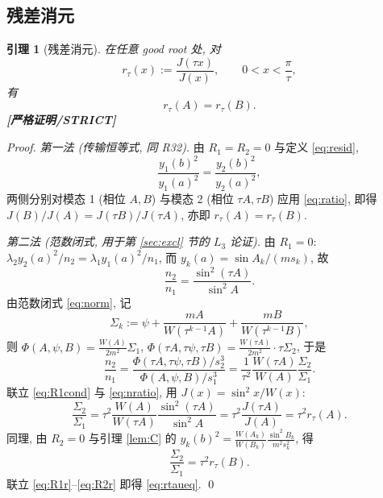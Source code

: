 \documentclass[UTF8]{ctexart}
\newtheorem{lemma}[theorem]{引理}
\newcommand{\STRICT}{\textbf{[严格证明/STRICT]}}
\begin{document}
\subsection{残差消元}

\begin{lemma}[残差消元]\label{lem:elim}
	在任意 good root 处, 对
	\begin{equation}
		r_\tau(x):=\frac{J(\tau x)}{J(x)},\qquad 0<x<\frac\pi\tau,
	\end{equation}
	有
	\begin{equation}
		r_\tau(A)=r_\tau(B).
		\label{eq:rtaueq}
	\end{equation}
	\STRICT{}
\end{lemma}

\begin{proof}
	\emph{第一法 (传输恒等式, 同 R32).} 由 $R_1=R_2=0$ 与定义 \eqref{eq:resid},
	\begin{equation}
		\frac{y_1(b)^2}{y_1(a)^2}=\frac{y_2(b)^2}{y_2(a)^2},
	\end{equation}
	两侧分别对模态 1 (相位 $A,B$) 与模态 2 (相位 $\tau A,\tau B$) 应用
	\eqref{eq:ratio}, 即得 $J(B)/J(A)=J(\tau B)/J(\tau A)$, 亦即
	$r_\tau(A)=r_\tau(B)$.

	\emph{第二法 (范数闭式, 用于第 \ref{sec:excl} 节的 $L_3$ 论证).}
	由 $R_1=0$: $\lambda_2y_2(a)^2/n_2=\lambda_1y_1(a)^2/n_1$, 而
	$y_k(a)=\sin A_k/(ms_k)$, 故
	\begin{equation}
		\frac{n_2}{n_1}=\frac{\sin^2(\tau A)}{\sin^2A}.
		\label{eq:R1cond}
	\end{equation}
	由范数闭式 \eqref{eq:norm}, 记
	\begin{equation}
		\Sigma_k:=\psi+\frac{mA}{W(\tau^{k-1}A)}+\frac{mB}{W(\tau^{k-1}B)},
		\label{eq:Sigma}
	\end{equation}
	则 $\Phi(A,\psi,B)=\frac{W(A)}{2m^2}\Sigma_1$,
	$\Phi(\tau A,\tau\psi,\tau B)=\frac{W(\tau A)}{2m^2}\cdot\tau\Sigma_2$, 于是
	\begin{equation}
		\frac{n_2}{n_1}
		=\frac{\Phi(\tau A,\tau\psi,\tau B)/s_2^3}{\Phi(A,\psi,B)/s_1^3}
		=\frac1{\tau^2}\frac{W(\tau A)}{W(A)}\frac{\Sigma_2}{\Sigma_1}.
		\label{eq:nratio}
	\end{equation}
	联立 \eqref{eq:R1cond} 与 \eqref{eq:nratio}, 用 $J(x)=\sin^2x/W(x)$:
	\begin{equation}
		\frac{\Sigma_2}{\Sigma_1}
		=\tau^2\frac{W(A)}{W(\tau A)}\frac{\sin^2(\tau A)}{\sin^2A}
		=\tau^2\frac{J(\tau A)}{J(A)}=\tau^2r_\tau(A).
		\label{eq:R1r}
	\end{equation}
	同理, 由 $R_2=0$ 与引理 \ref{lem:C} 的
	$y_k(b)^2=\frac{W(A_k)}{W(B_k)}\frac{\sin^2B_k}{m^2s_k^2}$, 得
	\begin{equation}
		\frac{\Sigma_2}{\Sigma_1}=\tau^2r_\tau(B).
		\label{eq:R2r}
	\end{equation}
	联立 \eqref{eq:R1r}--\eqref{eq:R2r} 即得 \eqref{eq:rtaueq}. \qed
\end{proof}
\end{document}
